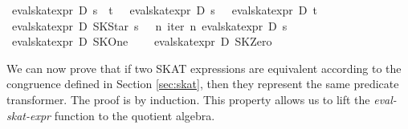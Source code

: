 \documentclass{llncs}
\begin{document}
\begin{isabellebody}
{}\ {}eval{}skat{}expr\ D\ {}s\ {}\ t{}\ {}\ {}\ eval{}skat{}expr\ D\ s\ {}\ {}\ eval{}skat{}expr\ D\ t\ {}{}\isanewline
{}\ {}eval{}skat{}expr\ D\ {}SKStar\ s{}\ {}\ {}\ {}{}n{}\ iter\ n\ {}eval{}skat{}expr\ D\ s{}\ {}{}{}\isanewline
{}\ {}eval{}skat{}expr\ D\ SKOne\ {}\ {}\ {}{}\isanewline
{}\ {}eval{}skat{}expr\ D\ SKZero\ {}\ {}\ {}{}{}\isanewline
\end{isabellebody}

We can now prove that if two SKAT expressions are equivalent according
to the congruence defined in Section \ref{sec:skat}, then they
represent the same predicate transformer. The proof is by
induction. This property allows us to lift the \textit{eval-skat-expr}
function to the quotient algebra.
\end{document}
